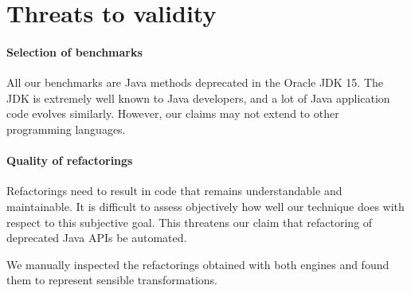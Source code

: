 \documentclass[sigconf,review,anonymous]{acmart}
\begin{document}

\section{Threats to validity}

\paragraph{Selection of benchmarks}
%
All our benchmarks are Java methods deprecated in the Oracle JDK 15.
The JDK is extremely well known to Java developers, and a lot
of Java application code evolves similarly.
%
However, our claims may not extend to other programming languages.


\paragraph{Quality of refactorings} Refactorings need to result in code that
remains understandable and maintainable.  It is difficult to assess
objectively how well our technique does with respect to this subjective
goal.  This threatens our claim that refactoring of deprecated Java APIs
be automated.

%
We manually inspected the refactorings obtained with
both engines and found them to represent sensible transformations.
\end{document}
